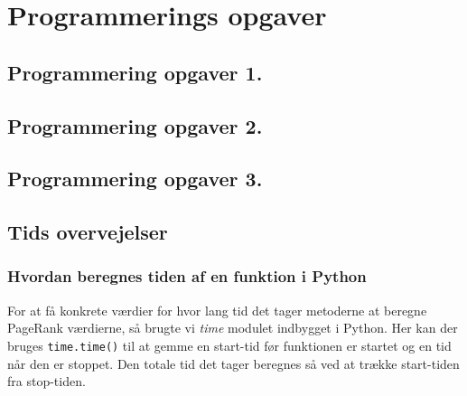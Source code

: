 \section{Programmerings opgaver}



\subsection*{Programmering opgaver 1.}



\subsection*{Programmering opgaver 2.}



\subsection*{Programmering opgaver 3.}


\subsection*{Tids overvejelser}
\subsubsection*{Hvordan beregnes tiden af en funktion i Python}
For at få konkrete værdier for hvor lang tid det tager metoderne at beregne PageRank værdierne, så brugte vi \emph{time} modulet indbygget i Python. Her kan der bruges \texttt{time.time()} til at gemme en start-tid før funktionen er startet og en tid når den er stoppet. Den totale tid det tager beregnes så ved at trække start-tiden fra stop-tiden.

